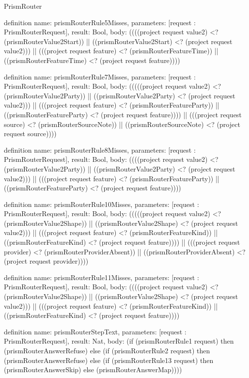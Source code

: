 \begin{lexlean}{PrismRouter}
\begin{semanticmodule}
definition{
  name: prismRouterRule5Misses,
  parameters: [request : PrismRouterRequest],
  result: Bool,
  body: ((((project request value2) <? (prismRouterValue2Start)) || ((prismRouterValue2Start) <? (project request value2))) || (((project request feature) <? (prismRouterFeatureTime)) || ((prismRouterFeatureTime) <? (project request feature))))
}

definition{
  name: prismRouterRule7Misses,
  parameters: [request : PrismRouterRequest],
  result: Bool,
  body: (((((project request value2) <? (prismRouterValue2Party)) || ((prismRouterValue2Party) <? (project request value2))) || (((project request feature) <? (prismRouterFeatureParty)) || ((prismRouterFeatureParty) <? (project request feature)))) || (((project request source) <? (prismRouterSourceNote)) || ((prismRouterSourceNote) <? (project request source))))
}

definition{
  name: prismRouterRule8Misses,
  parameters: [request : PrismRouterRequest],
  result: Bool,
  body: ((((project request value2) <? (prismRouterValue2Party)) || ((prismRouterValue2Party) <? (project request value2))) || (((project request feature) <? (prismRouterFeatureParty)) || ((prismRouterFeatureParty) <? (project request feature))))
}

definition{
  name: prismRouterRule10Misses,
  parameters: [request : PrismRouterRequest],
  result: Bool,
  body: (((((project request value2) <? (prismRouterValue2Shape)) || ((prismRouterValue2Shape) <? (project request value2))) || (((project request feature) <? (prismRouterFeatureKind)) || ((prismRouterFeatureKind) <? (project request feature)))) || (((project request provider) <? (prismRouterProviderAbsent)) || ((prismRouterProviderAbsent) <? (project request provider))))
}

definition{
  name: prismRouterRule11Misses,
  parameters: [request : PrismRouterRequest],
  result: Bool,
  body: ((((project request value2) <? (prismRouterValue2Shape)) || ((prismRouterValue2Shape) <? (project request value2))) || (((project request feature) <? (prismRouterFeatureKind)) || ((prismRouterFeatureKind) <? (project request feature))))
}

definition{
  name: prismRouterStepText,
  parameters: [request : PrismRouterRequest],
  result: Nat,
  body: (if (prismRouterRule1 request) then (prismRouterAnswerRefuse) else (if (prismRouterRule2 request) then (prismRouterAnswerRefuse) else (if (prismRouterRule13 request) then (prismRouterAnswerSkip) else (prismRouterAnswerMap))))
}


\end{semanticmodule}
\end{lexlean}
